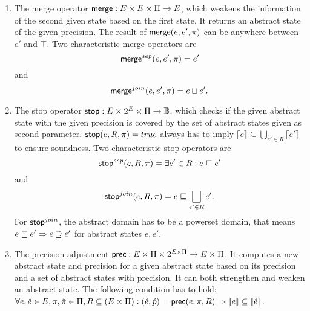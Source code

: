 \begin{enumerate}[leftmargin=*, label=\arabic*.]
\item
The merge operator $\operatorname{\operatorname{\mathsf{merge}}} : E \times E \times \Pi \rightarrow E$, which weakens the information of the second given state based on the first state. It returns an abstract state of the given precision. The result of $\operatorname{\operatorname{\mathsf{merge}}}(e, e', \pi)$ can be anywhere between $e'$ and $\top$.
Two characteristic merge operators are \[\operatorname{\operatorname{\mathsf{merge}}}^{sep}(e, e', \pi) = e'\] and \[\operatorname{\operatorname{\mathsf{merge}}}^{join}(e, e', \pi) = e \sqcup e'.\]

\item
The stop operator $\operatorname{\operatorname{\mathsf{stop}}} : E \times 2^E \times \Pi \rightarrow \mathbb{B}$, which checks if the given abstract state with the given precision is covered by the set of abstract states given as second parameter.
$\operatorname{\operatorname{\mathsf{stop}}}(e, R, \pi) = true$ always has to imply $\llbracket e \rrbracket \subseteq \bigcup_{e' \in R} \llbracket e' \rrbracket$ to ensure soundness.
Two characteristic stop operators are \[\operatorname{\operatorname{\mathsf{stop}}}^{sep}(e, R, \pi) = \exists e' \in R : e \sqsubseteq e'\] and \[\operatorname{\operatorname{\mathsf{stop}}}^{join}(e, R, \pi) = e \sqsubseteq \bigsqcup\limits_{e' \in R} e'.\]
For $\operatorname{\operatorname{\mathsf{stop}}}^{join}$, the abstract domain has to be a powerset domain, that means $e \sqsubseteq e' \Rightarrow e \supseteq e'$ for abstract states $e, e'$.

\item
The precision adjustment $\operatorname{\operatorname{\mathsf{prec}}} : E \times \Pi \times 2^{E \times \Pi} \rightarrow E \times \Pi$. It computes a new abstract state and precision for a given abstract state based on its precision and a set of abstract states with precision.
It can both strengthen and weaken an abstract state.
The following condition has to hold: $\forall e, \hat{e} \in E, \pi, \hat{\pi} \in \Pi, R \subseteq (E \times \Pi) : (\hat{e}, \hat{p}) = \operatorname{\operatorname{\mathsf{prec}}}(e, \pi, R) \Rightarrow \llbracket e \rrbracket \subseteq \llbracket \hat{e} \rrbracket$.

\end{enumerate} 

